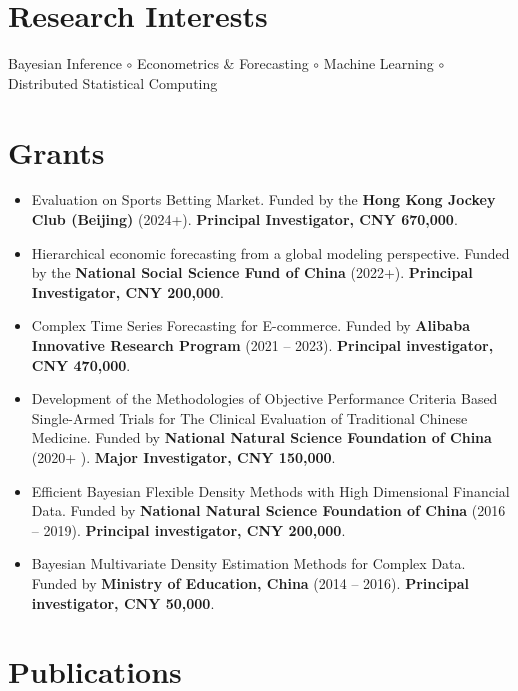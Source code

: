 \documentclass[twoside,a4paper]{article}
\begin{document}
\section{Research Interests}

Bayesian Inference $\circ$ Econometrics \& Forecasting $\circ$ Machine Learning $\circ$ Distributed Statistical Computing


\section{Grants}
\begin{itemize}

\item Evaluation on Sports Betting Market. Funded by the \textbf{Hong Kong Jockey Club (Beijing)} (2024+). \textbf{Principal Investigator, CNY 670,000}.

\item Hierarchical economic forecasting from a global modeling perspective. Funded by the \textbf{National Social Science Fund of China} (2022+). \textbf{Principal Investigator, CNY 200,000}.

\item Complex Time Series Forecasting for E-commerce. Funded by \textbf{Alibaba Innovative Research Program} (2021 -- 2023). \textbf{Principal investigator, CNY 470,000}.

\item Development of the Methodologies of Objective Performance Criteria Based Single-Armed Trials for The Clinical Evaluation of Traditional Chinese Medicine. Funded by \textbf{National Natural Science Foundation of China} (2020+  ). \textbf{Major Investigator, CNY 150,000}.

\item Efficient Bayesian Flexible Density Methods with High Dimensional Financial Data. Funded by \textbf{National Natural Science Foundation of China} (2016 -- 2019). \textbf{Principal investigator, CNY 200,000}.

\item Bayesian Multivariate Density Estimation Methods for Complex Data. Funded by \textbf{Ministry of Education, China} (2014 -- 2016). \textbf{Principal investigator, CNY 50,000}.

\end{itemize}

\section{Publications}
\end{document}
